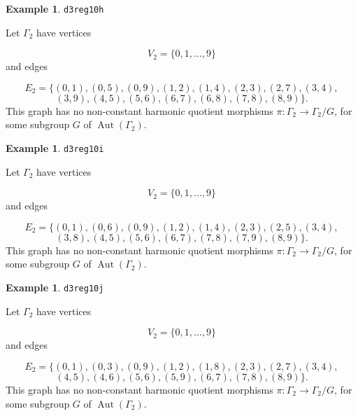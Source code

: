 \documentclass[12pt,letterpaper]{article}
\theoremstyle{definition}
\newtheorem{example}[theorem]{Example}
\DeclareMathOperator{\Aut}{Aut}
\begin{document}
\begin{example}%
\label{example:d3reg10h}
  {\tt d3reg10h}\newline
{\rm  
Let $\Gamma_2$ have vertices

\[
V_2=\{0,1,\dots,9\}
\]
and edges

\[
E_2 = \{
(0, 1), (0, 5), (0, 9), (1, 2), (1, 4), (2, 3), (2, 7), (3, 4), 
\]
\[
(3, 9), (4, 5), (5, 6), (6, 7), (6, 8), (7, 8), (8, 9)
\}.
\]
This graph has no non-constant harmonic quotient
morphisms $\pi: \Gamma_2\to \Gamma_2/G$, for some subgroup
$G$ of $\Aut(\Gamma_2)$.

}
\end{example}


\begin{example}%
\label{example:d3reg10i}
  {\tt d3reg10i}\newline
{\rm  
Let $\Gamma_2$ have vertices

\[
V_2=\{0,1,\dots,9\}
\]
and edges

\[
E_2 = \{
(0, 1), (0, 6), (0, 9), (1, 2), (1, 4), (2, 3), (2, 5), (3, 4),
\]
\[
(3, 8), (4, 5), (5, 6), (6, 7), (7, 8), (7, 9), (8, 9)
\}.
\]
This graph has no non-constant harmonic quotient
morphisms $\pi: \Gamma_2\to \Gamma_2/G$, for some subgroup
$G$ of $\Aut(\Gamma_2)$.

}
\end{example}



\begin{example}%
\label{example:d3reg10j}
  {\tt d3reg10j}\newline
{\rm  
Let $\Gamma_2$ have vertices

\[
V_2=\{0,1,\dots,9\}
\]
and edges

\[
E_2 = \{
(0, 1), (0, 3), (0, 9), (1, 2), (1, 8), (2, 3), (2, 7), (3, 4),
\]
\[
(4, 5), (4, 6), (5, 6), (5, 9), (6, 7), (7, 8), (8, 9)
\}.
\]
This graph has no non-constant harmonic quotient
morphisms $\pi: \Gamma_2\to \Gamma_2/G$, for some subgroup
$G$ of $\Aut(\Gamma_2)$.

}
\end{example}
\end{document}
